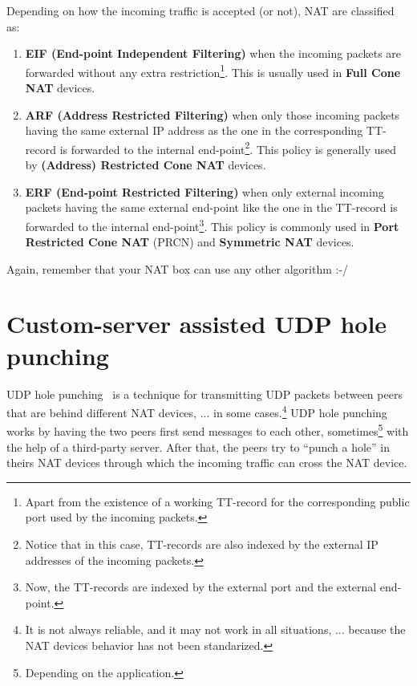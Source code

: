Depending on how the incoming traffic is accepted (or not), NAT are
classified as:

\begin{enumerate}
\item \textbf{EIF (End-point Independent Filtering)} when the incoming packets
  are forwarded without any extra restriction\footnote{Apart from the
    existence of a working TT-record for the corresponding public port
    used by the incoming packets.}. This is usually used in
  \textbf{Full Cone NAT} devices.
\item \textbf{ARF (Address Restricted Filtering)} when only those incoming
  packets having the same external IP address as the one in the
  corresponding TT-record is forwarded to the internal
  end-point\footnote{Notice that in this case, TT-records are also
    indexed by the external IP addresses of the incoming
    packets.}. This policy is generally used by \textbf{(Address)
    Restricted Cone NAT} devices.
\item \textbf{ERF (End-point Restricted Filtering)} when only external incoming
  packets having the same external end-point like the one in the
  TT-record is forwarded to the internal end-point\footnote{Now, the
    TT-records are indexed by the external port and the external
    end-point.}. This policy is commonly used in \textbf{Port
    Restricted Cone NAT} (PRCN) and \textbf{Symmetric NAT} devices.
\end{enumerate}

Again, remember that your NAT box can use any other algorithm :-/

\section{Custom-server assisted UDP hole punching}

UDP hole punching~\cite{srisuresh2008state} is a technique for
transmitting UDP packets between peers that are behind different NAT
devices, ... in some cases.\footnote{It is not always reliable, and it
  may not work in all situations, ... because the NAT devices behavior
  has not been standarized.} UDP hole punching works by having the two
peers first send messages to each other, sometimes\footnote{Depending
  on the application.} with the help of a third-party server. After
that, the peers try to ``punch a hole'' in theirs NAT devices through
which the incoming traffic can cross the NAT device.

